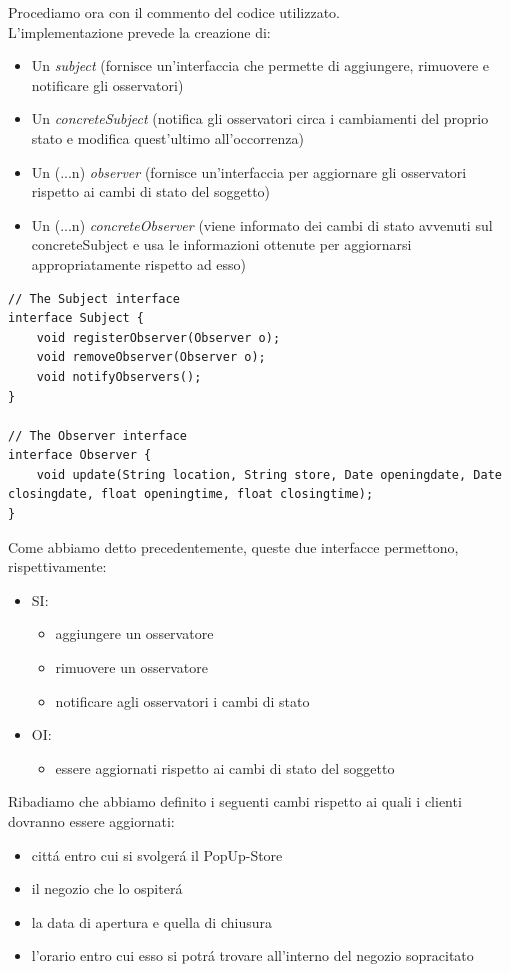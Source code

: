 \documentclass[12pt]{article}
\begin{document}
Procediamo ora con il commento del codice utilizzato. \\
L'implementazione prevede la creazione di:
\begin{itemize}
	\item Un \textit{subject} (fornisce un'interfaccia che permette di aggiungere, rimuovere e notificare gli osservatori)
	\item Un \textit{concreteSubject} (notifica gli osservatori circa i cambiamenti del proprio stato e modifica quest'ultimo all'occorrenza)
	\item Un (...n) \textit{observer} (fornisce un'interfaccia per aggiornare gli osservatori rispetto ai cambi di stato del soggetto)
	\item Un (...n) \textit{concreteObserver} (viene informato dei cambi di stato avvenuti sul concreteSubject e usa le informazioni ottenute per aggiornarsi appropriatamente rispetto ad esso)
\end{itemize}

\begin{lstlisting}
// The Subject interface 
interface Subject {
    void registerObserver(Observer o); 
    void removeObserver(Observer o); 
    void notifyObservers();
}

// The Observer interface 
interface Observer {
    void update(String location, String store, Date openingdate, Date closingdate, float openingtime, float closingtime); 
}
\end{lstlisting}

Come abbiamo detto precedentemente, queste due interfacce permettono, rispettivamente:
\begin{itemize}
	\item SI:
		\begin{itemize}
		\item aggiungere un osservatore 
		\item rimuovere un osservatore 
		\item notificare agli osservatori i cambi di stato
		\end{itemize}
	\item OI:
		\begin{itemize}
		\item essere aggiornati rispetto ai cambi di stato del soggetto
		\end{itemize}
\end{itemize}

Ribadiamo che abbiamo definito i seguenti cambi rispetto ai quali i clienti dovranno essere aggiornati:
\begin{itemize}
	\item citt\'a entro cui si svolger\'a il PopUp-Store 
	\item il negozio che lo ospiter\'a
	\item la data di apertura e quella di chiusura
	\item l'orario entro cui esso si potr\'a trovare all'interno del negozio sopracitato
\end{itemize}
\end{document}
